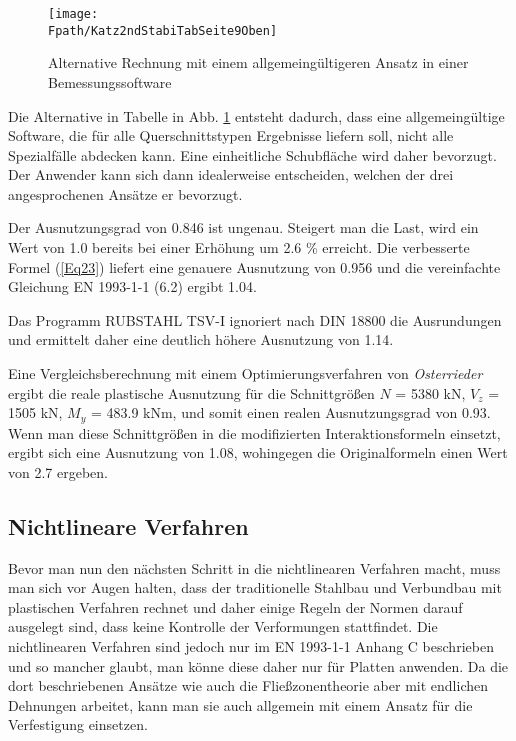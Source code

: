\begin{figure}[tbp] \centering
\centering
\if {} \sidecaption[t] \fi
\texttt{[image: \\Fpath/Katz2ndStabiTabSeite9Oben]}
\caption{Alternative Rechnung mit einem allgemeing\"{u}ltigeren Ansatz in einer Bemessungssoftware} \label{Katz2ndStabiTabSeite9Oben}
\end{figure}%

Die Alternative in Tabelle in Abb. \ref{Katz2ndStabiTabSeite9Oben} entsteht dadurch, dass eine allgemeing\"{u}ltige Software, die f\"{u}r alle Querschnittstypen Ergebnisse liefern soll, nicht alle Spezialf\"{a}lle abdecken kann. Eine einheitliche Schubfl\"{a}che wird daher bevorzugt. Der Anwender kann sich dann idealerweise entscheiden, welchen der drei angesprochenen Ans\"{a}tze er bevorzugt.

Der Ausnutzungsgrad von 0.846 ist ungenau. Steigert man die Last, wird ein Wert von 1.0 bereits bei einer Erh\"{o}hung um 2.6 \% erreicht. Die verbesserte Formel (\ref{Eq23}) liefert eine genauere Ausnutzung von 0.956 und die vereinfachte Gleichung EN 1993-1-1 (6.2) ergibt 1.04.

Das Programm RUBSTAHL TSV-I \cite{Kindmann2} ignoriert nach DIN 18800 die Ausrundungen und ermittelt daher eine deutlich h\"{o}here Ausnutzung von 1.14.

Eine Vergleichsberechnung mit einem Optimierungsverfahren von {\em Osterrieder\/} \cite{Osterrieder} ergibt die reale plastische Ausnutzung f\"{u}r die Schnittgr\"{o}{\ss}en $N$ = 5380 kN, $V_z$ = 1505 kN, $M_y$ = 483.9 kNm, und somit einen realen Ausnutzungsgrad von 0.93. Wenn man diese Schnittgr\"{o}{\ss}en in die modifizierten Interaktionsformeln einsetzt, ergibt sich eine Ausnutzung von 1.08, wohingegen die Originalformeln einen Wert von 2.7 ergeben.


{\textcolor{sectionTitleBlue}{\subsection{Nichtlineare Verfahren }}}

Bevor man nun den n\"{a}chsten Schritt in die nichtlinearen Verfahren macht, muss man sich vor Augen halten, dass der traditionelle Stahlbau und Verbundbau mit plastischen Verfahren rechnet und daher einige Regeln der Normen darauf ausgelegt sind, dass keine Kontrolle der Verformungen stattfindet. Die nichtlinearen Verfahren sind jedoch nur im EN 1993-1-1 Anhang C beschrieben und so mancher glaubt, man k\"{o}nne diese daher nur f\"{u}r Platten anwenden. Da die dort beschriebenen Ans\"{a}tze wie auch die Flie{\ss}zonentheorie aber mit endlichen Dehnungen arbeitet, kann man sie auch allgemein mit einem Ansatz f\"{u}r die Verfestigung einsetzen.

